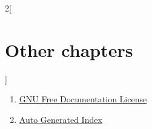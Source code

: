 \begin{multicols}{2}[\section{Other chapters}]
\begin{enumerate}
\item \hyperref[fdl-section-phantom]{GNU Free Documentation License}
\item \hyperref[index-section-phantom]{Auto Generated Index}
\end{enumerate}
\end{multicols}


